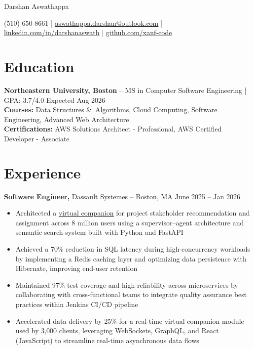 \documentclass[11pt]{article}       %
\begin{document}
\centerline{\Huge Darshan Aswathappa}

\vspace{5pt}

\centerline{(510)-650-8661 | \href{mailto:aswathappa.darshan@outlook.com}{aswathappa.darshan@outlook.com} | \href{https://www.linkedin.com/in/darshanaswath/}{linkedin.com/in/darshanaswath} | \href{https://github.com/xanf-code}{github.com/xanf-code}}

\vspace{-10pt}

\section*{Education}
\textbf{Northeastern University, Boston} -- MS in Computer Software Engineering | GPA: 3.7/4.0 
\hfill Expected Aug 2026 \\
\vspace{3px}
\textbf{Courses:} Data Structures \&\ Algorithms, Cloud Computing, Software Engineering, Advanced Web Architecture \\
\vspace{3px}
\textbf{Certifications:} AWS Solutions Architect - Professional, AWS Certified Developer - Associate
\vspace{-6.5pt}

\section*{Experience}

\textbf{Software Engineer,} {Dassault Systemes} -- Boston, MA \hfill June 2025 -- Jan 2026 \\
\vspace{-9pt}
\begin{itemize}
    \item Architected a \uline{\href{https://www.3ds.com/newsroom/press-releases/dassault-systemes-unveils-new-way-working-industry-ai-powered-virtual-companions}{virtual companion}} for project stakeholder recommendation and assignment across 8 million users using a supervisor–agent architecture and semantic search system built with Python and FastAPI
    \item Achieved a 70\% reduction in SQL latency during high-concurrency workloads by implementing a Redis caching layer and optimizing data persistence with Hibernate, improving end-user retention
    \item Maintained 97\% test coverage and high reliability across microservices by collaborating with cross-functional teams to integrate quality assurance best practices within Jenkins CI/CD pipeline
    \item Accelerated data delivery by 25\% for a real-time virtual companion module used by 3,000 clients, leveraging WebSockets, GraphQL, and React (JavaScript) to streamline real-time asynchronous data flows
\end{itemize}
\end{document}
